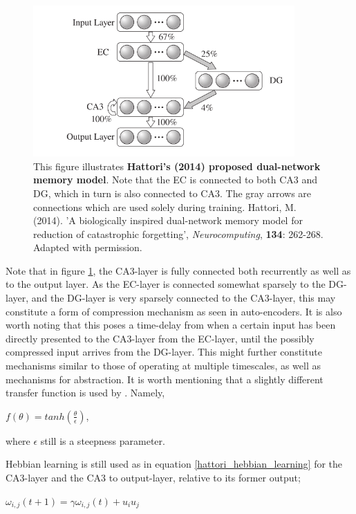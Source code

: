 \begin{figure}
\centering
\includegraphics[width=10cm]{fig/hattori2014_hpc_module}
\caption{This figure illustrates \textbf{Hattori's (2014) proposed dual-network memory model}. Note that the EC is connected to both CA3 and DG, which in turn is also connected to CA3. The gray arrows are connections which are used solely during training.
Hattori, M. (2014). 'A biologically inspired dual-network memory model for reduction of catastrophic forgetting', \textit{Neurocomputing}, \textbf{134}: 262-268. Adapted with permission.}
\label{fig:hattori_2014_model}
\end{figure}

Note that in figure \ref{fig:hattori_2014_model}, the CA3-layer is fully connected both recurrently as well as to the output layer. As the EC-layer is connected somewhat sparsely to the DG-layer, and the DG-layer is very sparsely connected to the CA3-layer, this may constitute a form of compression mechanism as seen in auto-encoders. It is also worth noting that this poses a time-delay from when a certain input has been directly presented to the CA3-layer from the EC-layer, until the possibly compressed input arrives from the DG-layer. This might further constitute mechanisms similar to those of operating at multiple timescales, as well as mechanisms for abstraction.
It is worth mentioning that a slightly different transfer function is used by \cite{Hattori2014}. Namely,

\begin{center}
    $f(\theta) = tanh(\frac{\theta}{\epsilon})$,
\end{center}
where $\epsilon$ still is a steepness parameter.

Hebbian learning is still used as in equation \ref{hattori_hebbian_learning} for the CA3-layer and the CA3 to output-layer, relative to its former output;

\begin{center}
\begin{math}
    \omega_{i,j}(t+1) = \gamma \omega_{i,j}(t) + u_i u_j
\end{math}
\end{center}

